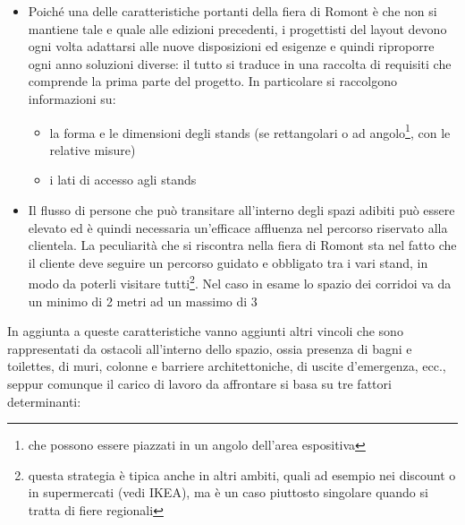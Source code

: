 \documentclass[12pt,a4paper,openright,twoside]{report}
\begin{document}
\begin{itemize}
\item Poich\'{e} una delle caratteristiche portanti della fiera di Romont \`{e} che non si mantiene tale e quale alle edizioni precedenti, i progettisti del layout devono ogni volta adattarsi alle nuove disposizioni ed esigenze e quindi riproporre ogni anno soluzioni diverse: il tutto si traduce in una raccolta di requisiti che comprende la prima parte del progetto. In particolare si raccolgono informazioni su:
\begin{itemize}
\item la forma e le dimensioni degli stands (se rettangolari o ad angolo\footnote{che possono essere piazzati in un angolo dell'area espositiva}, con le relative misure)
\item i lati di accesso agli stands
\end{itemize}
\item Il flusso di persone che pu\`{o} transitare all'interno degli spazi adibiti pu\`{o} essere elevato ed \`{e} quindi necessaria un'efficace affluenza nel percorso riservato alla clientela. La peculiarit\`{a} che si riscontra nella fiera di Romont sta nel fatto che il cliente deve seguire un percorso guidato e obbligato tra i vari stand, in modo da poterli visitare tutti\footnote{questa strategia \`{e} tipica anche in altri ambiti, quali ad esempio nei discount o in supermercati (vedi IKEA), ma \`{e} un caso piuttosto singolare quando si tratta di fiere regionali}. Nel caso in esame lo spazio dei corridoi va da un minimo di 2 metri ad un massimo di 3
\end{itemize}
In aggiunta a queste caratteristiche vanno aggiunti altri vincoli che sono rappresentati da ostacoli all'interno dello spazio, ossia presenza di bagni e toilettes, di muri, colonne e barriere architettoniche, di uscite d'emergenza, ecc., seppur comunque il carico di lavoro da affrontare si basa su tre fattori determinanti:
\end{document}
